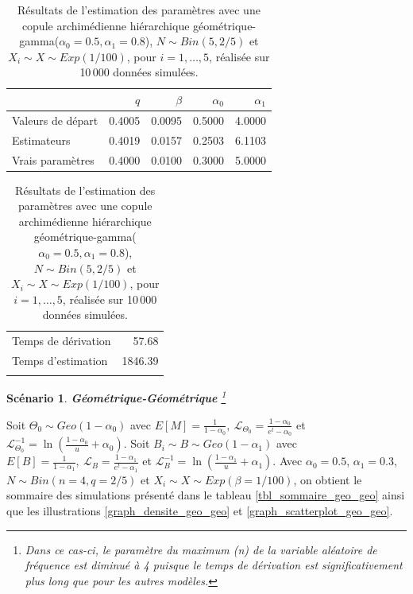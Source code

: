 \documentclass{article}
\newtheorem{Scenario}{Scénario}
\begin{document}
	\begin{table}[H]
		\centering
		\begin{tabular}{lrrrr}
			\hline
			& $q$ & $\beta$ & $\alpha_0$ & $\alpha_1$ \\ 
			\hline
			Valeurs de départ & 0.4005 & 0.0095 & 0.5000 & 4.0000 \\ 
			Estimateurs & 0.4019 & 0.0157 & 0.2503 & 6.1103 \\ 
			Vrais paramètres & 0.4000 & 0.0100 & 0.3000 & 5.0000 \\
			\hline
		\end{tabular}
		\begin{tabular}{lr}
			\hline
			&  \\ 
			\hline
			Temps de dérivation & 57.68 \\ 
			Temps d'estimation & 1846.39 \\ 
			\\
			\hline
		\end{tabular}
		\caption[Résultats du scénario \ref{scenario_geo_gamma}]{Résultats de l'estimation des paramètres avec une copule archimédienne hiérarchique géométrique-gamma($\alpha_0=0.5, \alpha_1=0.8$), $N \sim Bin(5, 2/5)$ et $X_i \sim X \sim Exp(1/100)$, pour $i=1,\dots,5$, réalisée sur 10\,000 données simulées.}
		\label{tbl_resultats_geo_gamma}
	\end{table}



		\begin{Scenario}\label{scenario_geo_geo}
			\textbf{Géométrique-Géométrique}
			\footnote{Dans ce cas-ci, le paramètre du maximum (n) de la variable aléatoire de fréquence est diminué à 4 puisque le temps de dérivation est significativement plus long que pour les autres modèles.}
		\end{Scenario}
		
		Soit $\Theta_0 \sim Geo(1-\alpha_0)$ avec $E[M] = \frac{1}{1-\alpha_0},\ \mathscr{L}_{\Theta_0} = \frac{1-\alpha_0}{e^t-\alpha_0}$ et $\mathscr{L}^{-1}_{\Theta_0} = \ln\left(\frac{1 - \alpha_0}{u}+\alpha_0\right)$.
			Soit $B_i \sim B \sim Geo(1-\alpha_1)$ avec $E[B] = \frac{1}{1-\alpha_1},\ \mathscr{L}_{B} = \frac{1-\alpha_1}{e^t-\alpha_1}$ et $\mathscr{L}^{-1}_{B} = \ln\left(\frac{1 - \alpha_1}{u}+\alpha_1\right)$. Avec $\alpha_0 = 0.5$, $\alpha_1 = 0.3$, $N\sim Bin(n=4 , q=2/5)$  et $X_i \sim X \sim Exp(\beta = 1/100)$, on obtient le sommaire des simulations présenté dans le tableau \ref{tbl_sommaire_geo_geo} ainsi que les illustrations \ref{graph_densite_geo_geo} et \ref{graph_scatterplot_geo_geo}. 
		
\end{document}
